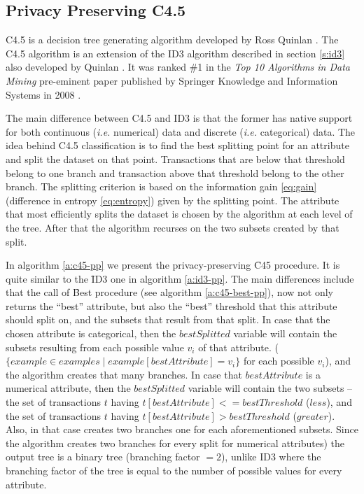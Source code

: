 \subsection{Privacy Preserving C4.5}\label{s:pp-c45}
C4.5 is a decision tree generating algorithm developed by Ross Quinlan \cite{quinlan1993c4}.
The C4.5 algorithm is an extension of the ID3 algorithm described in section \ref{s:id3} also developed by Quinlan \cite{quinlan1986induction}.
It was ranked \#1 in the \textit{Top 10 Algorithms in Data Mining} pre\hyp eminent paper published by Springer Knowledge and Information Systems in 2008 \cite{wu2008top}.

The main difference between C4.5 and ID3 is that the former has native support for both continuous (\textit{i.e.} numerical) data and discrete (\textit{i.e.} categorical) data. The idea behind C4.5 classification is to find the best splitting point for an attribute and split the dataset on that point.
Transactions that are below that threshold belong to one branch and transaction above that threshold belong to the other branch.
The splitting criterion is based on the information gain \ref{eq:gain} (difference in entropy \ref{eq:entropy}) given by the splitting point.
The attribute that most efficiently splits the dataset is chosen by the algorithm at each level of the tree.
After that the algorithm recurses on the two subsets created by that split.


In algorithm \ref{a:c45-pp} we present the privacy\hyp preserving \f{C45} procedure.
It is quite similar to the \f{ID3} one in algorithm \ref{a:id3-pp}.
The main differences include that the call of \f{Best} procedure (see algorithm \ref{a:c45-best-pp}), now not only returns the ``best'' attribute, but also the ``best'' threshold that this attribute should split on, and the subsets that result from that split.
In case that the chosen attribute is categorical, then the $bestSplitted$ variable will contain the subsets resulting from each possible value $v_i$ of that attribute. ($\{example \in examples \mid example[bestAttribute] = v_i\}$ for each possible $v_i$), and the algorithm creates that many branches.
In case that $bestAttribute$ is a numerical attribute, then the $bestSplitted$ variable will contain the two subsets -- the set of transactions $t$ having $t[bestAttribute] <= bestThreshold$ ($less$), and the set of transactions $t$ having $t[bestAttribute] > bestThreshold$ ($greater$).
Also, in that case creates two branches one for each aforementioned subsets.
Since the algorithm creates two branches for every split for numerical attributes) the output tree is a binary tree (branching factor $= 2$), unlike ID3 where the branching factor of the tree is equal to the number of possible values for every attribute.

